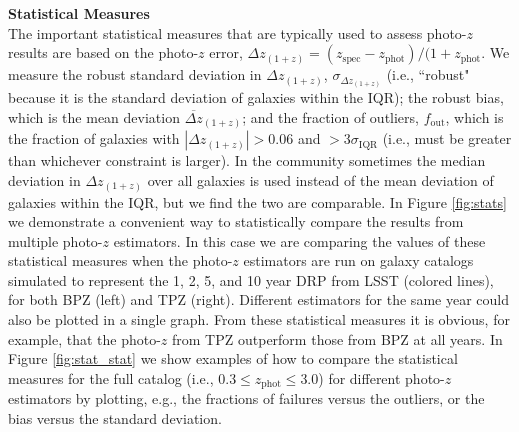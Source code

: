 \documentclass[DM,lsstdraft,toc]{lsstdoc}
\begin{document}
\smallskip \noindent \textbf{Statistical Measures} \\
The important statistical measures that are typically used to assess photo-$z$ results are based on the photo-$z$ error, $\Delta z_{(1+z)} = (z_\mathrm{spec}-z_\mathrm{phot})/(1+z_\mathrm{phot}$. We measure the robust standard deviation in $\Delta z_{(1+z)}$, $\sigma_{\Delta z_{(1+z)}}$ (i.e., ``robust" because it is the standard deviation of galaxies within the IQR); the robust bias, which is the mean deviation $\overline{\Delta z}_{(1+z)}$; and the fraction of outliers, $f_\mathrm{out}$, which is the fraction of galaxies with $|\Delta z_{(1+z)}|> 0.06$ and $>3\sigma_\mathrm{IQR}$ (i.e., must be greater than whichever constraint is larger). In the community sometimes the median deviation in $\Delta z_{(1+z)}$ over all galaxies is used instead of the mean deviation of galaxies within the IQR, but we find the two are comparable. In Figure \ref{fig:stats} we demonstrate a convenient way to statistically compare the results from multiple photo-$z$ estimators. In this case we are comparing the values of these statistical measures when the photo-$z$ estimators are run on galaxy catalogs simulated to represent the 1, 2, 5, and 10 year DRP from LSST (colored lines), for both BPZ (left) and TPZ (right). Different estimators for the same year could also be plotted in a single graph. From these statistical measures it is obvious, for example, that the photo-$z$ from TPZ outperform those from BPZ at all years. In Figure \ref{fig:stat_stat} we show examples of how to compare the statistical measures for the full catalog (i.e., $0.3 \leq z_\mathrm{phot} \leq 3.0$) for different photo-$z$ estimators by plotting, e.g., the fractions of failures versus the outliers, or the bias versus the standard deviation.
\end{document}
